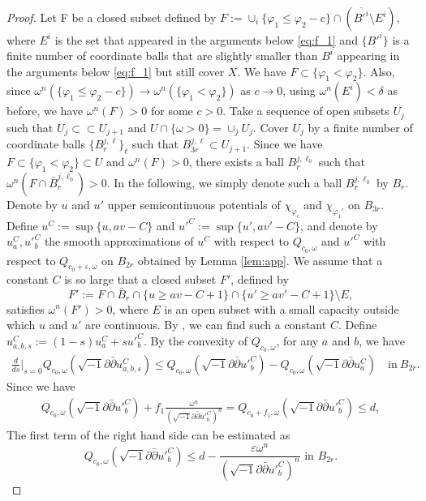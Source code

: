 \documentclass[10pt,a4paper]{amsart}
\numberwithin{equation}{section}
\newcommand{\delb}{\sqrt{-1}\partial\bar{\partial}}
\begin{document}
\begin{proof}
    Let F be a closed subset defined by $F:=\cup_i\{\varphi_1\le\varphi_2-c\}\cap (\overline{B'^i}\setminus E^i)$, where $E^i$ is the set that appeared in the arguments below \eqref{eq:f_1} and $\{B'^i\}$ is a finite number of coordinate balls that are slightly smaller than $B^i$ appearing in the arguments below \eqref{eq:f_1} but still cover $X$. We have $F\subset \{\varphi_1<\varphi_2\}$. Also, since $\omega^n(\{\varphi_1\le\varphi_2-c\})\to\omega^n(\{\varphi_1<\varphi_2\})$ as $c\to0$, using $\omega^n(E^i)<\delta$ as before, we have $\omega^n(F)>0$ for some $c>0$.
    Take a sequence of open subsets $U_j$ such that $U_j\subset\subset U_{j+1}$ and $U\cap\{\omega>0\}=\cup_j U_j$. Cover $U_j$ by a finite number of coordinate balls $\{B^{j,\ell}_r\}_\ell$ such that $B^{j,\ell}_{3r}\subset U_{j+1}$. Since we have $F\subset \{\varphi_1<\varphi_2\}\subset U$ and $\omega^n(F)>0$, there exists a ball $B^{j,\ell_0}_{r}$ such that $\omega^n(F\cap \bar{B}^{j,\ell_0}_r)>0$. In the following, we simply denote such a ball $B^{j,\ell_0}_r$ by $B_r$.
    Denote by $u$ and $u'$ upper semicontinuous potentials of $\chi_{\varphi_i}$ and $\chi_{\varphi_1'}$ on $B_{3r}$. Define $u^C:=\sup\{u,av-C\}$ and $u'^C:=\sup\{u',av'-C\}$, and denote by $u^C_a, u'^C_b$ the smooth approximations of $u^C$ with respect to $Q_{c_0,\omega}$ and $u'^C$ with respect to $Q_{c_0+\varepsilon,\omega}$ on $B_{2r}$ obtained by Lemma \ref{lem:app}. 
    We assume that a constant $C$ is so large that a closed subset $F'$, defined by $$F':=F\cap \bar{B}_r\cap\{u\ge av-C+1\}\cap\{u'\ge av'-C+1\}\setminus E,$$ satisfies $\omega^n(F')>0$, where $E$ is an open subset with a small capacity outside which $u$ and $u'$ are continuous. By \cite[Theorem 6.10]{BT}, we can find such a constant $C$.
    Define $u^C_{a,b,s}:=(1-s)u^C_a+s u'^C_b$. By the convexity of $Q_{c_0,\omega}$, for any $a$ and $b$, we have
    \begin{align*}
        \frac{d}{ds}\Bigg\vert_{s=0} Q_{c_0,\omega}(\delb u_{a,b,s}^C)\le Q_{c_0,\omega}(\delb u'^C_b)-Q_{c_0,\omega}(\delb u^C_a) \quad \text{in}\  B_{2r}.
    \end{align*}
    Since we have
    \begin{align*}
        Q_{c_0,\omega}(\delb u'^C_b)+f_1\frac{\omega^n}{(\delb u'^C_b)^n}=Q_{c_0+f_1,\omega}(\delb u'^C_b)\le d,
    \end{align*}
    The first term of the right hand side can be estimated as
    \begin{equation*}
        Q_{c_0,\omega}(\delb u'^C_b)\le d-\frac{\varepsilon\omega^n}{\left(\delb u'^C_b\right)^n} \text{ in } B_{2r}.

\end{equation*}
\end{proof}
\end{document}
